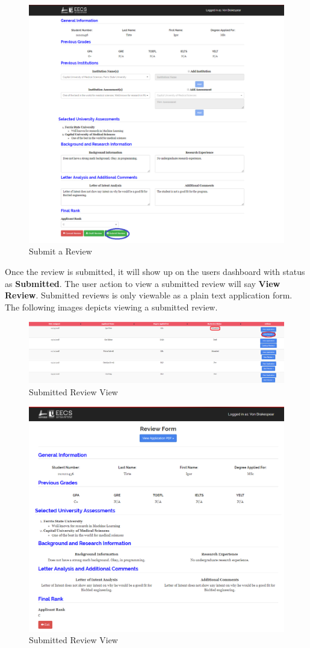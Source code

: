 \documentclass[fontsize=12pt,paper=letter,twoside]{scrartcl}
\begin{document}
\begin{figure}[!htb]
\begin{center}
\includegraphics[width=.9\textwidth]{images/submit_review.png}
\end{center}
\caption{Submit a Review}
\label{fig:submit_review}
\end{figure}

\bigskip
\noindent Once the review is submitted, it will show up on the users dashboard with status as \textbf{Submitted}. The user action to view a submitted review will say \textbf{View Review}. Submitted reviews is only viewable as a plain text application form. The following images depicts viewing a submitted review.

\begin{figure}[!htb]
\begin{center}
\includegraphics[width=.9\textwidth]{images/submitted_review.png}
\end{center}
\caption{Submitted Review View}
\label{fig:submitted_review}
\end{figure}

\begin{figure}[!htb]
\begin{center}
\includegraphics[width=.7\textwidth]{images/submit_review_view.png}
\end{center}
\caption{Submitted Review View}
\label{fig:submit_review_view}
\end{figure}
\end{document}

